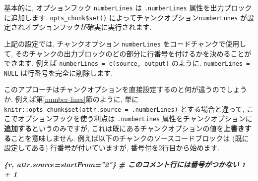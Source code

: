 \documentclass[
  11pt,
  lualatex,ja=standard,jafont=noto]{bxjsreport}
\newenvironment{Shaded}{\begin{snugshade}}{\end{snugshade}}
\newcommand{\AttributeTok}[1]{\textcolor[rgb]{0.77,0.63,0.00}{#1}}
\newcommand{\ControlFlowTok}[1]{\textcolor[rgb]{0.13,0.29,0.53}{\textbf{#1}}}
\newcommand{\FunctionTok}[1]{\textcolor[rgb]{0.00,0.00,0.00}{#1}}
\newcommand{\InformationTok}[1]{\textcolor[rgb]{0.56,0.35,0.01}{\textbf{\textit{#1}}}}
\newcommand{\NormalTok}[1]{#1}
\newcommand{\OtherTok}[1]{\textcolor[rgb]{0.56,0.35,0.01}{#1}}
\newcommand{\SpecialCharTok}[1]{\textcolor[rgb]{0.00,0.00,0.00}{#1}}
\newcommand{\StringTok}[1]{\textcolor[rgb]{0.31,0.60,0.02}{#1}}
\begin{document}
\begin{Shaded}
\end{Shaded}

基本的に, オプションフック \texttt{numberLines} は \texttt{.numberLines} 属性を出力ブロックに追加します. \texttt{opts\_chunk\$set()} によってチャンクオプション\texttt{numberLunes} が設定されオプションフックが確実に実行されます.

上記の設定では, チャンクオプション \texttt{numberLines} をコードチャンクで使用して, そのチャンクの出力ブロックのどの部分に行番号を付けるかを決めることができます. 例えば \texttt{numberLines = c(\textquotesingle{}source\textquotesingle{},\ \textquotesingle{}output\textquotesingle{})} のように. \texttt{numberLines = NULL} は行番号を完全に削除します.

このアプローチはチャンクオプションを直接設定するのと何が違うのでしょうか. 例えば第\ref{number-lines}節のように, 単に \texttt{knitr::opts\_chunk\$set(attr.source = \textquotesingle{}.numberLines\textquotesingle{})} とする場合と違って, ここでオプションフックを使う利点は \texttt{.numberLines} 属性をチャンクオプションに\textbf{追加する}というのみですが, これは既にあるチャンクオプションの値を\textbf{上書きする}ことを意味しません. 例えば以下のチャンクのソースコードブロックは (既に設定してある) 行番号が付いていますが, 番号付を2行目から始めます.

\begin{Shaded}
\begin{Highlighting}[]
\InformationTok{\textasciigrave{}\textasciigrave{}\textasciigrave{}\{r, attr.source=\textquotesingle{}startFrom="2"\textquotesingle{}\}}
\InformationTok{\# このコメント行には番号がつかない}
\InformationTok{1 + 1}
\InformationTok{\textasciigrave{}\textasciigrave{}\textasciigrave{}}
\end{Highlighting}
\end{Shaded}
\end{document}
